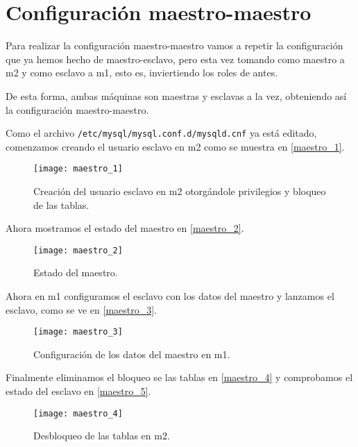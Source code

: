 \chapter{Configuración maestro-maestro}

Para realizar la configuración maestro-maestro vamos a repetir la configuración que ya hemos hecho de maestro-esclavo, pero esta vez tomando como maestro a m2 y como esclavo a m1, esto es, inviertiendo los roles de antes.

De esta forma, ambas máquinas son maestras y esclavas a la vez, obteniendo así la configuración maestro-maestro.

Como el archivo \verb|/etc/mysql/mysql.conf.d/mysqld.cnf| ya está editado, comenzamos creando el usuario esclavo en m2 como se muestra en \eqref{maestro_1}.

\begin{figure}[h!]
\begin{center}
\caption{Creación del usuario esclavo en m2 otorgándole privilegios y bloqueo de las tablas.}
\label{maestro_1}
\texttt{[image: maestro\_1]}
\end{center}
\end{figure}

Ahora mostramos el estado del maestro en \eqref{maestro_2}.

\begin{figure}[h!]
\begin{center}
\caption{Estado del maestro.}
\label{maestro_2}
\texttt{[image: maestro\_2]}
\end{center}
\end{figure}

Ahora en m1 configuramos el esclavo con los datos del maestro y lanzamos el esclavo, como se ve en \eqref{maestro_3}.

\begin{figure}[h!]
\begin{center}
\caption{Configuración de los datos del maestro en m1.}
\label{maestro_3}
\texttt{[image: maestro\_3]}
\end{center}
\end{figure}

Finalmente eliminamos el bloqueo se las tablas en \eqref{maestro_4} y comprobamos el estado del esclavo en \eqref{maestro_5}.

\begin{figure}[h!]
\begin{center}
\caption{Desbloqueo de las tablas en m2.}
\label{maestro_4}
\texttt{[image: maestro\_4]}
\end{center}
\end{figure}

